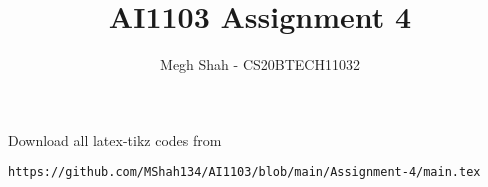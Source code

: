 \documentclass[journal,12pt,twocolumn]{IEEEtran}
\DeclareMathOperator*{\Res}{Res}
\begin{document}
\newcommand{\BEQA}{\begin{eqnarray}}
\newcommand{\EEQA}{\end{eqnarray}}
\newcommand{\define}{\stackrel{\triangle}{=}}

\raggedbottom
\setlength{\parindent}{0pt}
\providecommand{\mbf}{\mathbf}
\providecommand{\pr}[1]{\ensuremath{\Pr\left(#1\right)}}
\providecommand{\qfunc}[1]{\ensuremath{Q\left(#1\right)}}
\providecommand{\sbrak}[1]{\ensuremath{{}\left[#1\right]}}
\providecommand{\lsbrak}[1]{\ensuremath{{}\left[#1\right.}}
\providecommand{\rsbrak}[1]{\ensuremath{{}\left.#1\right]}}
\providecommand{\brak}[1]{\ensuremath{\left(#1\right)}}
\providecommand{\lbrak}[1]{\ensuremath{\left(#1\right.}}
\providecommand{\rbrak}[1]{\ensuremath{\left.#1\right)}}
\providecommand{\cbrak}[1]{\ensuremath{\left\{#1\right\}}}
\providecommand{\lcbrak}[1]{\ensuremath{\left\{#1\right.}}
\providecommand{\rcbrak}[1]{\ensuremath{\left.#1\right\}}}
\theoremstyle{remark}
\newtheorem{rem}{Remark}
\newcommand{\sgn}{\mathop{\mathrm{sgn}}}
\providecommand{\abs}[1]{\vert#1\vert}
\providecommand{\res}[1]{\Res\displaylimits_{#1}} 
\providecommand{\norm}[1]{\lVert#1\rVert}
\providecommand{\mtx}[1]{\mathbf{#1}}
\providecommand{\mean}[1]{E[ #1 ]}
\providecommand{\fourier}{\overset{\mathcal{F}}{ \rightleftharpoons}}
\providecommand{\system}{\overset{\mathcal{H}}{ \longleftrightarrow}}
\newcommand{\solution}{\noindent \textbf{Solution: }}
\newcommand{\cosec}{\,\text{cosec}\,}
\providecommand{\dec}[2]{\ensuremath{\overset{#1}{\underset{#2}{\gtrless}}}}
\newcommand{\myvec}[1]{\ensuremath{\begin{pmatrix}#1\end{pmatrix}}}
\newcommand{\mydet}[1]{\ensuremath{\begin{vmatrix}#1\end{vmatrix}}}
\makeatletter
{}
\makeatother
\let\StandardTheFigure\thefigure
\let\vec\mathbf
\renewcommand{\thefigure}{\theproblem}
\def\putbox#1#2#3{\makebox[0in][l]{\makebox[#1][l]{}\raisebox{\baselineskip}[0in][0in]{\raisebox{#2}[0in][0in]{#3}}}}
     \def\rightbox#1{\makebox[0in][r]{#1}}
     \def\centbox#1{\makebox[0in]{#1}}
     \def\topbox#1{\raisebox{-\baselineskip}[0in][0in]{#1}}
     \def\midbox#1{\raisebox{-0.5\baselineskip}[0in][0in]{#1}}
\vspace{3cm}
\title{AI1103 Assignment 4}
\author{Megh Shah - CS20BTECH11032}
\maketitle
\newpage
\bigskip
\renewcommand{\thefigure}{\theenumi}
\renewcommand{\thetable}{\theenumi}
Download all latex-tikz codes from 
%
\begin{lstlisting}
https://github.com/MShah134/AI1103/blob/main/Assignment-4/main.tex
\end{lstlisting}
\end{document}
